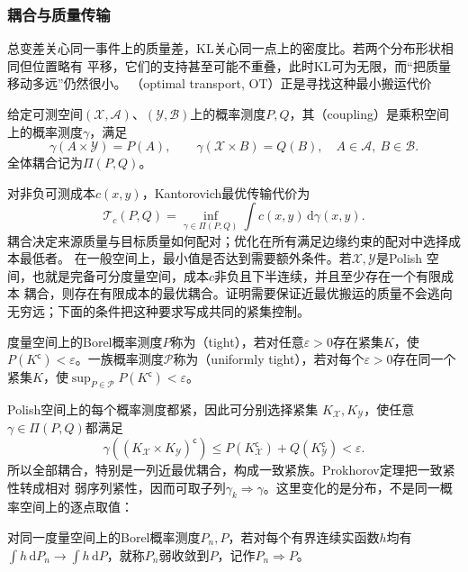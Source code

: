 \subsubsection{耦合与质量传输}
总变差关心同一事件上的质量差，KL关心同一点上的密度比。若两个分布形状相同但位置略有
平移，它们的支持甚至可能不重叠，此时KL可为无限，而“把质量移动多远”仍然很小。
（optimal transport, OT）正是寻找这种最小搬运代价
\begin{definition}[耦合]
  \label{def:information-coupling}
  给定可测空间\((\mathcal X,\mathcal A)\)、\((\mathcal Y,\mathcal B)\)上的概率测度\(P,Q\)，其（coupling）是乘积空间上的概率测度\(\gamma\)，满足
  \[ \gamma(A\times\mathcal Y)=P(A),\qquad
     \gamma(\mathcal X\times B)=Q(B),\quad A\in\mathcal A,\ B\in\mathcal B. \]
  全体耦合记为\(\Pi(P,Q)\)。
\end{definition}
对非负可测成本\(c(x,y)\)，Kantorovich最优传输代价为
\begin{equation}
  \mathcal{T}_c(P,Q)
  =
  \inf_{\gamma\in\Pi(P,Q)}
  \int c(x,y)\,\mathrm{d}\gamma(x,y).
  \label{eq:information-kantorovich-transport}
\end{equation}
耦合决定来源质量与目标质量如何配对；优化在所有满足边缘约束的配对中选择成本最低者。
在一般空间上，最小值是否达到需要额外条件。若\(\mathcal X,\mathcal Y\)是Polish
空间，也就是完备可分度量空间，成本\(c\)非负且下半连续，并且至少存在一个有限成本
耦合，则存在有限成本的最优耦合。证明需要保证近最优搬运的质量不会逃向无穷远；下面的条件把这种要求写成共同的紧集控制。
\begin{definition}[紧概率测度与一致紧族]
  \label{def:information-tightness}
  度量空间上的Borel概率测度\(P\)称为（tight），若对任意\(\varepsilon>0\)存在紧集\(K\)，使\(P(K^{\mathsf c})<\varepsilon\)。一族概率测度\(\mathcal P\)称为（uniformly tight），若对每个\(\varepsilon>0\)存在同一个紧集\(K\)，使\(\sup_{P\in\mathcal P}P(K^{\mathsf c})<\varepsilon\)。
\end{definition}
Polish空间上的每个概率测度都紧，因此可分别选择紧集
\(K_{\mathcal X},K_{\mathcal Y}\)，使任意\(\gamma\in\Pi(P,Q)\)都满足
\[
  \gamma((K_{\mathcal X}\times K_{\mathcal Y})^{\mathsf c})
  \leq
  P(K_{\mathcal X}^{\mathsf c})+Q(K_{\mathcal Y}^{\mathsf c})
  <\varepsilon.
\]
所以全部耦合，特别是一列近最优耦合，构成一致紧族。Prokhorov定理把一致紧性转成相对
弱序列紧性，因而可取子列\(\gamma_k\Rightarrow\gamma\)。这里变化的是分布，不是同一概率空间上的逐点取值：
\begin{definition}[概率测度的弱收敛]
  \label{def:information-weak-measure-convergence}
对同一度量空间上的Borel概率测度\(P_n,P\)，若对每个有界连续实函数\(h\)均有\(\int h\,\mathrm dP_n\to\int h\,\mathrm dP\)，就称\(P_n\)弱收敛到\(P\)，记作\(P_n\Rightarrow P\)。
\end{definition}
